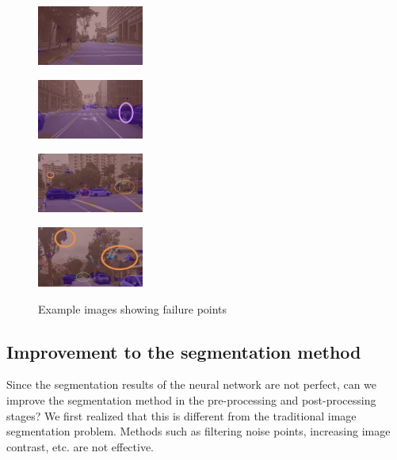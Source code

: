 \documentclass[10pt]{article}
\theoremstyle{nonumberplain}
\begin{document}
\begin{figure}[H]
	\centering
	\begin{minipage}[t]{0.24\textwidth}
		\centering
		\includegraphics[width=3.5cm]{fig6a.jpg}
		\subcaption{}
		\label{fig6a}
	\end{minipage}
	\begin{minipage}[t]{0.24\textwidth}
		\centering
		\includegraphics[width=3.5cm]{fig6b.jpg}
		\subcaption{}
		\label{fig6b}
	\end{minipage}
	\begin{minipage}[t]{0.24\textwidth}
		\centering
		\includegraphics[width=3.5cm]{fig6c.jpg}
		\subcaption{}
		\label{fig6c}
	\end{minipage}
	\begin{minipage}[t]{0.24\textwidth}
		\centering
		\includegraphics[width=3.5cm]{fig6d.jpg}
		\subcaption{}
		\label{fig6d}
	\end{minipage}
	\caption{Example images showing failure points}
	\label{fig6}
\end{figure} 


\subsection{Improvement to the segmentation method}

\hspace{1.0em}
Since the segmentation results of the neural network are not perfect, can we improve the segmentation method in the pre-processing and post-processing stages? We first realized that this is different from the traditional image segmentation problem. Methods such as filtering noise points, increasing image contrast, etc. are not effective.
\end{document}
